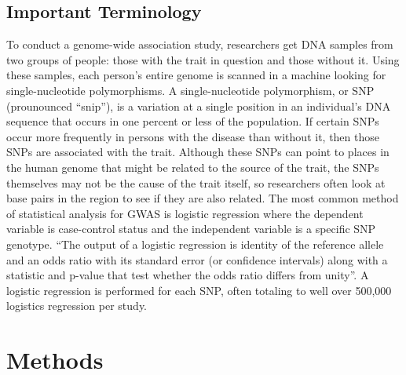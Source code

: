 \documentclass{article}
\begin{document}
\subsection*{Important Terminology}
To conduct a genome-wide association study, researchers get DNA samples from two
groups of people: those with the trait in question and those without it. Using 
these samples, each person's entire genome is scanned in a machine looking for 
single-nucleotide polymorphisms. A single-nucleotide polymorphism, or SNP 
(prounounced ``snip''), is a variation at a single position in an individual's 
DNA sequence that occurs in one percent or less of the population. If certain 
SNPs occur more frequently in persons with the disease than without it, then 
those SNPs are associated with the trait. Although these SNPs can point to places 
in the human genome that might be related to the source of the trait, the SNPs 
themselves may not be the cause of the trait itself, so researchers often look 
at base pairs in the region to see if they are also related\cite{NatureEducat}. 
The most common method of statistical analysis for GWAS is logistic regression 
where the dependent variable is case-control status and the independent variable 
is a specific SNP genotype. ``The output of a logistic regression is identity of 
the reference allele and an odds ratio with its standard error (or confidence 
intervals) along with a statistic and p-value that test whether the odds ratio 
differs from unity''\cite{Corvin2010}. A logistic regression is performed for 
each SNP, often totaling to well over 500,000 logistics regression per study.


\section*{Methods}
\end{document}

